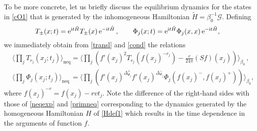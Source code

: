 \documentclass[12pt,a4paper]{article}
\newcommand{\ee}{{\rm e}}
\newcommand{\ii}{{\rm i}}
\newcommand{\cG}{\mathcal{G}}
\theoremstyle{definition}
\theoremstyle{remark}
\begin{document}
To be more concrete, let us briefly discuss 
the equilibrium dynamics for the states in \eqref{cO1} that is generated by
the inhomogeneous Hamiltonian $\tilde H=\beta_0^{-1}\cG$. Defining
\begin{equation}
T_\pm(x;t)=\ee^{\ii t\tilde H}T_\pm(x)\,\ee^{-\ii t\tilde H}\,,\qquad
\Phi_j(x;t)=\ee^{\ii t\tilde H}\Phi_j(x,x)\,\ee^{-\ii t\tilde H}, 
\end{equation}
we immediately obtain from \eqref{transl} and \eqref{cond} the relations
\begin{align}
&\Big\langle \prod_{j} T_{r_j}(x_j;t_j) \Big\rangle_{\text{neq}}
=\Big\langle\prod_{j} \left( f'(x_j)^2T_{r_j}(f(x_j)^{-r_j}) -
\frac{c}{24\pi}(Sf)(x_j) \right)\Big\rangle_{\beta_0}\,,\label{Tcorreqdyn} \\
&\Big\langle \prod_{j}\Phi_j(x_j;t_j) \Big\rangle_{\text{neq}}\,=\Big\langle
\prod\limits_j\left(f'(x_j)^{\Delta^+_{\Phi_j}}f'(x_j)^{\Delta^-_{\Phi_j}}
\Phi_j(f(x_j)^-,f(x_j)^+)\right)\Big\rangle_{\beta_0},\label{Phicorreqdyn}
\end{align}
where $f(x_j)^{-r}=f(x_j)-rvt_j$. Note the difference of the right-hand sides
with those of \eqref{neqexp} and \eqref{primneq} corresponding to
the dynamics generated by the homogeneous Hamiltonian $H$ of \eqref{Hdef1}
which results in the time dependence in the arguments of function $f$. 
\vskip 0.1cm
\end{document}
